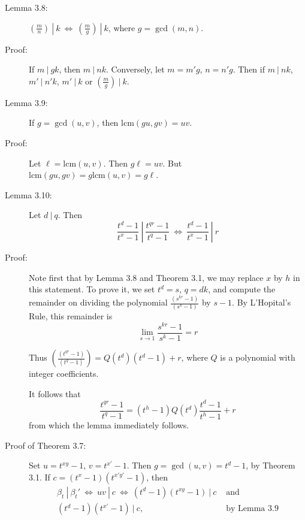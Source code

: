 \begin{description}

  \item[Lemma 3.8:] $\left( \frac{m}{n} \right)\ \left|\ k\ \Longleftrightarrow\ \left( \frac{m}{g} \right)\ \right|\ k$, where $g = \gcd(m,n)$.

  \item[Proof:] If $m\ |\ gk$, then $m\ |\ nk$. Conversely, let $m = m'g$, $n = n'g$. Then if $m\ |\ nk$, $m'\ |\ n'k$, $m'\ |\ k$ or $\left( \frac{m}{g} \right)\ \left|\ k \right.$.

  \item[Lemma 3.9:] If $g = \gcd(u,v)$, then $\text{lcm} (gu,gv) = uv$.

  \item[Proof:] Let $\ell = \text{lcm}(u,v)$. Then $g\ell = uv$. But $\text{lcm} (gu,gv) = g \text{lcm}(u,v) = g\ell$.

  \item[Lemma 3.10:] Let $d\ |\ q$. Then
    \begin{equation*}
    \frac{t^{d}-1}{t^{x}-1}\ \left|\ \frac{t^{qr}-1}{t^{q}-1}\ \Longleftrightarrow\ \frac{t^{d}-1}{t^{x}-1}\ \right|\ r
    \end{equation*}

  \item[Proof:] Note first that by Lemma 3.8 and Theorem 3.1, we may replace $x$ by $h$ in this statement. To prove it, we set $t^{d} = s$, $q = dk$, and compute the remainder on dividing the polynomial $\frac{(s^{kr}-1)}{(s^{k}-1)}$ by $s-1$. By L'Hopital's Rule, this remainder is
    \begin{equation*} 
    \lim_{s \to 1} \frac{s^{kr}-1}{s^{k}-1} = r
    \end{equation*}

    Thus $\left( \frac{(t^{qr}-1)}{(t^{q}-1)} \right) = Q (t^{d}) (t^{d}-1) + r$, where $Q$ is a polynomial with integer coefficients.

    It follows that
    \begin{equation*} 
    \frac{t^{qr}-1}{t^{q}-1} = (t^{h}-1) Q(t^{d}) \frac{t^{d}-1}{t^{h}-1} + r
    \end{equation*}
    from which the lemma immediately follows.

  \item[Proof of Theorem 3.7:] Set $u = t^{xy}-1$, $v = t^{x'}-1$. Then $g = \gcd(u,v) = t^{d}-1$, by Theorem 3.1. If $c = (t^{x}-1)(t^{x'y'}-1)$, then
    \begin{align*}
    \beta_{t}\ |\ \beta_{t}'\ \Longleftrightarrow\ uv\ |\ c\ \Longleftrightarrow\ (t^{d}-1)(t^{xy}-1)\ |\ c & \text{ and} \\
    (t^{d}-1)(t^{x'}-1)\ |\ c, & \text{ by Lemma 3.9}
    \end{align*}


\end{description}
